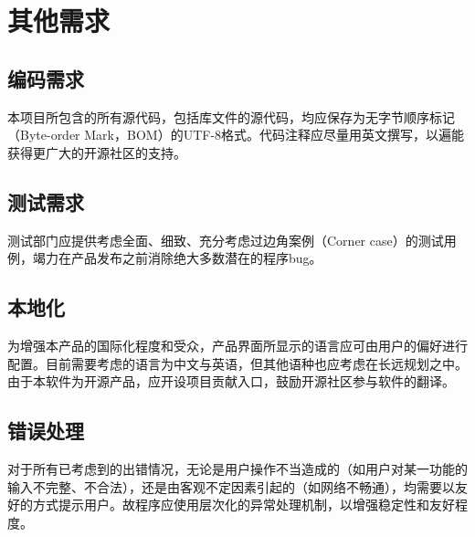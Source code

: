 \chapter{其他需求}


\section{编码需求}
本项目所包含的所有源代码，包括库文件的源代码，均应保存为无字节顺序标记（Byte-order Mark，BOM）的UTF-8格式。代码注释应尽量用英文撰写，以遍能获得更广大的开源社区的支持。

\section{测试需求}
测试部门应提供考虑全面、细致、充分考虑过边角案例（Corner case）的测试用例，竭力在产品发布之前消除绝大多数潜在的程序bug。

\section{本地化}
为增强本产品的国际化程度和受众，产品界面所显示的语言应可由用户的偏好进行配置。目前需要考虑的语言为中文与英语，但其他语种也应考虑在长远规划之中。
由于本软件为开源产品，应开设项目贡献入口，鼓励开源社区参与软件的翻译。

\section{错误处理}
对于所有已考虑到的出错情况，无论是用户操作不当造成的（如用户对某一功能的输入不完整、不合法），还是由客观不定因素引起的（如网络不畅通），均需要以友好的方式提示用户。故程序应使用层次化的异常处理机制，以增强稳定性和友好程度。